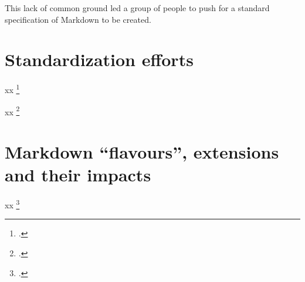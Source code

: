 This lack of common ground led a group of people to push for a standard specification of Markdown to be created.

\section{Standardization efforts}

xx \footcite{leonard2016text}

xx \footcite{commonmark}

\section{Markdown ``flavours'', extensions and their impacts}


xx \footcite{voegler2014markdown}
